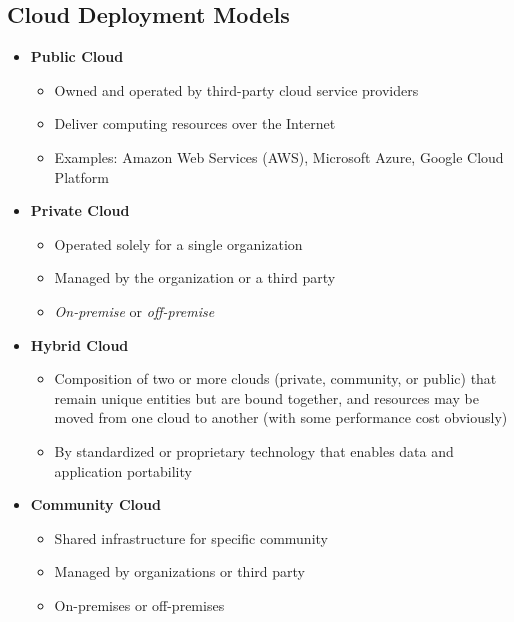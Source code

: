 \begin{itemize}
\section{Cloud Deployment Models}
\begin{itemize}
   \item \textbf{Public Cloud}
   \begin{itemize}
      \item Owned and operated by third-party cloud service providers
      \item Deliver computing resources over the Internet
      \item Examples: Amazon Web Services (AWS), Microsoft Azure, Google Cloud Platform
   \end{itemize}
   \item \textbf{Private Cloud}
   \begin{itemize}
      \item Operated solely for a single organization
      \item Managed by the organization or a third party
      \item \textit{On-premise} or \textit{off-premise}
   \end{itemize}
   \item \textbf{Hybrid Cloud}
   \begin{itemize}
      \item Composition of two or more clouds (private, community, or public) that remain unique entities but are bound together, and resources may be moved from one cloud to another (with some performance cost obviously) 
      \item By standardized or proprietary technology that enables data and application portability
   \end{itemize}
   \item \textbf{Community Cloud}
   \begin{itemize}
      \item Shared infrastructure for specific community
      \item Managed by organizations or third party
      \item On-premises or off-premises
   \end{itemize}
\end{itemize}


\end{itemize}
